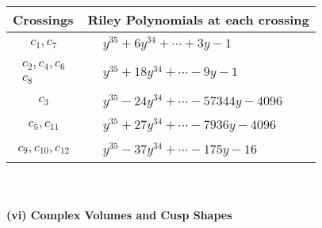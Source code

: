 \documentclass[1p]{elsarticle_modified}
\theoremstyle{definition}
\begin{document}
\begin{tabular}{m{50pt}|m{274pt}}
Crossings & \hspace{64pt}Riley Polynomials at each crossing \\
\hline $$\begin{aligned}c_{1},c_{7}\end{aligned}$$&$\begin{aligned}
&y^{35}+6 y^{34}+\cdots+3 y-1
\end{aligned}$\\
\hline $$\begin{aligned}c_{2},c_{4},c_{6}\\c_{8}\end{aligned}$$&$\begin{aligned}
&y^{35}+18 y^{34}+\cdots-9 y-1
\end{aligned}$\\
\hline $$\begin{aligned}c_{3}\end{aligned}$$&$\begin{aligned}
&y^{35}-24 y^{34}+\cdots-57344 y-4096
\end{aligned}$\\
\hline $$\begin{aligned}c_{5},c_{11}\end{aligned}$$&$\begin{aligned}
&y^{35}+27 y^{34}+\cdots-7936 y-4096
\end{aligned}$\\
\hline $$\begin{aligned}c_{9},c_{10},c_{12}\end{aligned}$$&$\begin{aligned}
&y^{35}-37 y^{34}+\cdots-175 y-16
\end{aligned}$\\
\hline
\end{tabular}\\~\\
\newpage\flushleft \textbf{(vi) Complex Volumes and Cusp Shapes}
\end{document}
